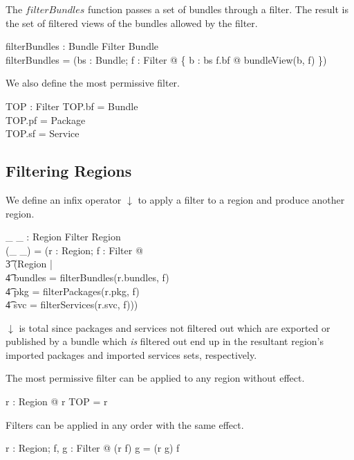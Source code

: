 \documentclass[a4paper,9pt,twoside]{article}
\begin{document}
The $filterBundles$ function passes a set of bundles through a filter.
The result is the set of filtered views of the bundles allowed by the filter.
\begin{axdef}
  filterBundles : \power Bundle \cross Filter \fun \power Bundle \\
\where
  filterBundles = (\lambda bs : \power Bundle; f : Filter @ \{ b : bs \cap f.bf @ bundleView(b, f) \}) \\
\end{axdef}

We also define the most permissive filter.
\begin{axdef}
  TOP : Filter
\where
  TOP.bf = Bundle \\
  TOP.pf = Package \\
  TOP.sf = Service \\
\end{axdef}

\subsection{Filtering Regions}

We define an infix operator $\downarrow$ to apply a filter to a region and produce another region.
\begin{axdef}
  \_ \downarrow \_ : Region \cross Filter \fun Region \\
\where
  (\_ \downarrow \_) = (\lambda r : Region;  f : Filter @ \\
\t3   (\mu Region | \\
\t4 bundles = filterBundles(r.bundles, f) \land \\
\t4 pkg = filterPackages(r.pkg, f) \land \\
\t4 svc = filterServices(r.svc, f))) \\
\end{axdef}
$\downarrow$ is total since packages and services not filtered out which are exported or published by a
bundle which \textit{is} filtered out end up
in the resultant region's imported packages and imported services sets, respectively.

The most permissive filter can be applied to any region without effect.
\begin{argue}
  \shows \forall r : Region @ r \downarrow TOP = r \\
\end{argue}

Filters can be applied in any order with the same effect.
\begin{argue}
  \shows \forall r : Region; f, g : Filter @ (r \downarrow f) \downarrow g = (r \downarrow g) \downarrow f \\
\end{argue}
\end{document}
